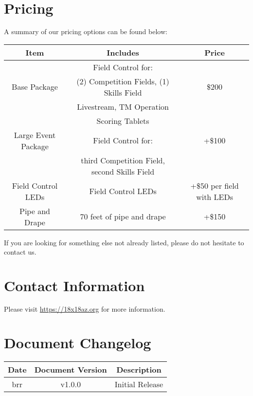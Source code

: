 \documentclass[12pt]{article}
\begin{document}
\section{Pricing}
A summary of our pricing options can be found below:
\begin{center}
    \begin{tabular}{|c|c|c|}
        \hline
        \textbf{Item} & \textbf{Includes} & \textbf{Price} \\
        \hline
                 & Field Control for:    &  \\
        Base Package & (2) Competition Fields, (1) Skills Field         & \$200 \\
                 & Livestream, TM Operation & \\
                 & Scoring Tablets          & \\
        \hline
        Large Event Package & Field Control for: & +\$100 \\
        & third Competition Field, second Skills Field & \\
        \hline
        Field Control LEDs & Field Control LEDs & +\$50 per field with LEDs \\
        \hline
        Pipe and Drape & 70 feet of pipe and drape & +\$150 \\
        \hline
    \end{tabular}
\end{center}
If you are looking for something else not already listed, please do not hesitate to contact us.

\section{Contact Information}
Please visit \url{https://18x18az.org} for more information.
\pagebreak
\section{Document Changelog}
\begin{center}
\begin{tabular}{|c|c|c|}
    \hline
    \textbf{Date} & \textbf{Document Version} & \textbf{Description} \\
    \hline
    brr & v1.0.0 & Initial Release \\
    \hline
\end{tabular}
\end{center}
\end{document}
